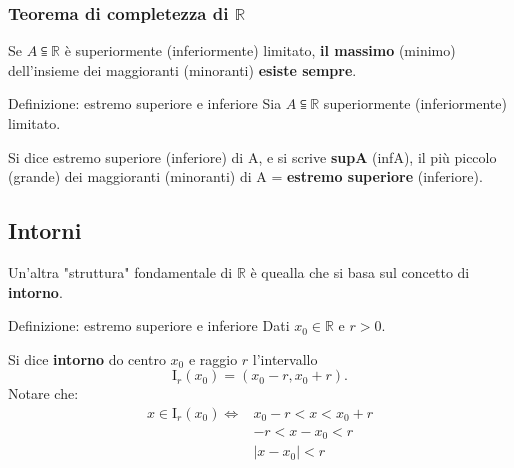 \documentclass[x11names]{article}
\begin{document}
		\begin{center}
		\colorbox{myred}{\begin{minipage}{5.75in}
				\begin{redes}{}
					\subsubsection{Teorema di completezza di $\mathbb{R}$}
					Se $A \subseteqq \mathbb{R}$ è superiormente (inferiormente) limitato, \textbf{il massimo} (minimo) dell'insieme  dei maggioranti (minoranti) \textbf{esiste sempre}.
				\end{redes}
				\end{minipage}}        
		\end{center}
	\begin{center}
		\colorbox{myblue}{\begin{minipage}{5.75in}
				\begin{blues}{Definizione: estremo superiore e inferiore}
				Sia $A \subseteqq \mathbb{R}$  superiormente (inferiormente) limitato.
				
				Si dice estremo superiore (inferiore) di A, e si scrive \textbf{supA} (infA), il più piccolo (grande) dei maggioranti (minoranti) di A = \textbf{estremo superiore} (inferiore).
				\end{blues}
		\end{minipage}}       
	\end{center}
	\subsection{Intorni}
	Un'altra  "struttura" fondamentale di $\mathbb{R}$ è quealla che si basa sul concetto di \textbf{intorno}.
	
	\begin{center}
		\colorbox{myblue}{\begin{minipage}{5.75in}
				\begin{blues}{Definizione: estremo superiore e inferiore}
					Dati $x_0 \in \mathbb{R}$ e $r > 0$.
					
					Si dice \textbf{intorno} do centro $x_0$ e raggio $r$ l'intervallo 
					\[
					\text{I}_r (x_0) = (x_0 -r, x_0 +r)
					.\]
					Notare che:
					\begin{align*}
						x \in \text{I}_r(x_0) \Longleftrightarrow & x_0 - r < x < x_0 + r \\
						& - r < x -x_0 < r \\
						& |x-x_0| < r
					\end{align*}
					
					
				\end{blues}
		\end{minipage}}       
	\end{center}
	
\end{document}
